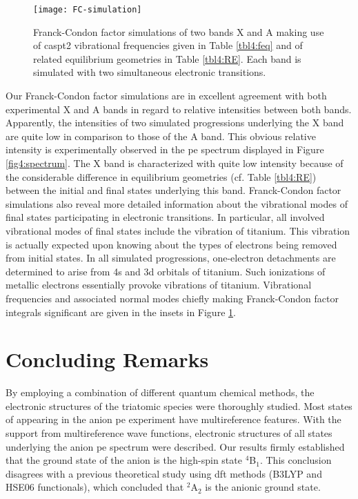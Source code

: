 \begin{refsection}
\begin{figure}[htb!]
	\centering
	\texttt{[image: FC-simulation]}
	\caption{Franck-Condon factor simulations of two bands X and A making use of \acrshort{caspt2} vibrational frequencies given in Table \ref{tbl4:feq} and of related equilibrium geometries in Table \ref{tbl4:RE}. Each band is simulated with two simultaneous electronic transitions.} 
	\label{fig4:FC}
\end{figure} 




Our Franck-Condon factor simulations are in excellent agreement with both experimental X and A bands in regard to relative intensities between both bands. Apparently, the intensities of two simulated progressions underlying the X band are quite low in comparison to those of the A band. This obvious relative intensity is experimentally observed in the  \acrshort{pe} spectrum displayed in Figure \ref{fig4:spectrum}. The X band is characterized with quite low intensity because of the considerable difference in equilibrium geometries (cf. Table \ref{tbl4:RE}) between the initial and final states underlying this band. Franck-Condon factor simulations also reveal more detailed information about the vibrational modes of final states participating in electronic transitions. In particular, all involved vibrational modes of final states include the vibration of titanium. This vibration is actually expected upon knowing about the types of electrons being removed from initial states. In all simulated progressions, one-electron detachments are determined to arise from 4s and 3d orbitals of titanium. Such ionizations of metallic electrons essentially provoke vibrations of titanium. Vibrational frequencies and associated normal modes chiefly making Franck-Condon factor integrals significant are given in the insets in Figure \ref{fig4:FC}.




\section{Concluding Remarks}



By employing a combination of different quantum chemical methods, the electronic structures of the triatomic species  were thoroughly studied. Most states of  appearing in the anion \acrshort{pe} experiment have multireference features. With the support from multireference wave functions, electronic structures of all states underlying the anion \acrshort{pe} spectrum were described. Our results firmly established that the ground state of the anion  is the high-spin state $^4$B$_1$. This conclusion disagrees with a previous theoretical study using \acrshort{dft} methods (B3LYP and HSE06 functionals), which concluded that $^2$A$_2$ is the anionic ground state.





\end{refsection}
